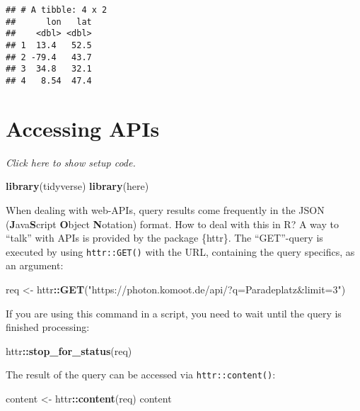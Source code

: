 \documentclass[]{book}
\newenvironment{Shaded}{\begin{snugshade}}{\end{snugshade}}
\newcommand{\KeywordTok}[1]{\textcolor[rgb]{0.13,0.29,0.53}{\textbf{#1}}}
\newcommand{\NormalTok}[1]{#1}
\newcommand{\OperatorTok}[1]{\textcolor[rgb]{0.81,0.36,0.00}{\textbf{#1}}}
\newcommand{\StringTok}[1]{\textcolor[rgb]{0.31,0.60,0.02}{#1}}
\begin{document}
\begin{verbatim}
## # A tibble: 4 x 2
##      lon   lat
##    <dbl> <dbl>
## 1  13.4   52.5
## 2 -79.4   43.7
## 3  34.8   32.1
## 4   8.54  47.4
\end{verbatim}

\hypertarget{accessing-apis}{%
\section{Accessing APIs}\label{accessing-apis}}

\emph{Click here to show setup code.}

\begin{Shaded}
\begin{Highlighting}[]
\KeywordTok{library}\NormalTok{(tidyverse)}
\KeywordTok{library}\NormalTok{(here)}
\end{Highlighting}
\end{Shaded}

When dealing with web-APIs, query results come frequently in the JSON (\textbf{J}ava\textbf{S}cript \textbf{O}bject \textbf{N}otation) format.
How to deal with this in R?
A way to ``talk'' with APIs is provided by the package \{httr\}.
The ``GET''-query is executed by using \texttt{httr::GET()} with the URL, containing the query specifics, as an argument:

\begin{Shaded}
\begin{Highlighting}[]
\NormalTok{req <-}\StringTok{ }\NormalTok{httr}\OperatorTok{::}\KeywordTok{GET}\NormalTok{(}\StringTok{"https://photon.komoot.de/api/?q=Paradeplatz&limit=3"}\NormalTok{)}
\end{Highlighting}
\end{Shaded}

If you are using this command in a script, you need to wait until the query is finished processing:

\begin{Shaded}
\begin{Highlighting}[]
\NormalTok{httr}\OperatorTok{::}\KeywordTok{stop_for_status}\NormalTok{(req)}
\end{Highlighting}
\end{Shaded}

The result of the query can be accessed via \texttt{httr::content()}:

\begin{Shaded}
\begin{Highlighting}[]
\NormalTok{content <-}\StringTok{ }\NormalTok{httr}\OperatorTok{::}\KeywordTok{content}\NormalTok{(req)}
\NormalTok{content}
\end{Highlighting}
\end{Shaded}
\end{document}
